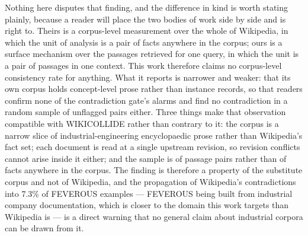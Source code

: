 \documentclass[preprint,3p,times]{elsarticle}
\begin{document}
Nothing here disputes that finding, and the difference in kind is worth
stating plainly, because a reader will place the two bodies of work side by
side and is right to. Theirs is a corpus-level measurement over the whole of
Wikipedia, in which the unit of analysis is a pair of facts anywhere in the
corpus; ours is a surface mechanism over the passages retrieved for one query,
in which the unit is a pair of passages in one context. This work therefore
claims no corpus-level consistency rate for anything. What it reports is
narrower and weaker: that its own corpus holds concept-level prose rather
than instance records, so that readers confirm none of the contradiction gate's
alarms and find no contradiction in a random sample of unflagged pairs either.
Three things make that observation compatible with WIKICOLLIDE rather than
contrary to it: the corpus is a narrow slice of industrial-engineering
encyclopaedic prose rather than Wikipedia's fact set; each document is read at
a single upstream revision, so revision conflicts cannot arise inside it
either; and the sample is of passage pairs rather than of facts anywhere in the
corpus. The finding is therefore a property of the substitute corpus and not
of Wikipedia, and the propagation of Wikipedia's contradictions into 7.3\% of
FEVEROUS examples --- FEVEROUS being built from industrial company
documentation, which is closer to the domain this work targets than Wikipedia
is --- is a direct warning that no general claim about industrial corpora can
be drawn from it.
\end{document}
